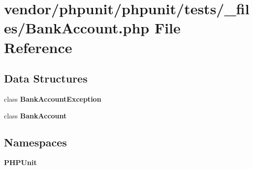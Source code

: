 \section{vendor/phpunit/phpunit/tests/\+\_\+files/\+Bank\+Account.php File Reference}
\label{phpunit_2tests_2__files_2_bank_account_8php}
\subsection*{Data Structures}
\begin{DoxyCompactItemize}
\item 
class {\bf Bank\+Account\+Exception}
\item 
class {\bf Bank\+Account}
\end{DoxyCompactItemize}
\subsection*{Namespaces}
\begin{DoxyCompactItemize}
\item 
 {\bf P\+H\+P\+Unit}
\end{DoxyCompactItemize}

